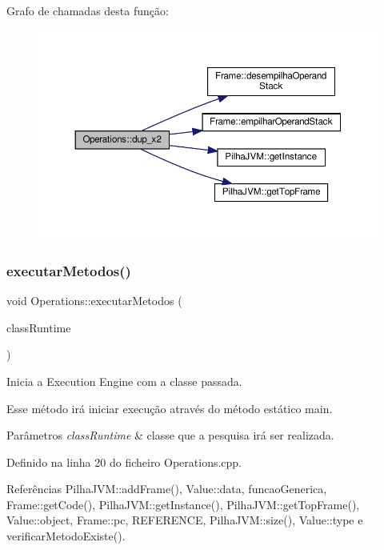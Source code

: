 Grafo de chamadas desta função\+:\nopagebreak
\begin{figure}[H]
\begin{center}
\leavevmode
\includegraphics[width=350pt]{classOperations_adbba871c60bfb34344f2012936beeb25_cgraph}
\end{center}
\end{figure}
\mbox{\label{classOperations_ab771bdb83af6f55d93d126b944d4e73b}} 
\subsubsection{\texorpdfstring{executar\+Metodos()}{executarMetodos()}}
{\footnotesize\ttfamily void Operations\+::executar\+Metodos (\begin{DoxyParamCaption}\item[{\hyperlink{classStaticClass}{Static\+Class} $\ast$}]{class\+Runtime }\end{DoxyParamCaption})}



Inicia a Execution Engine com a classe passada. 

Esse método irá iniciar execução através do método estático main. 
\begin{DoxyParams}{Parâmetros}
{\em class\+Runtime} & classe que a pesquisa irá ser realizada. \\
\hline
\end{DoxyParams}


Definido na linha 20 do ficheiro Operations.\+cpp.



Referências Pilha\+J\+V\+M\+::add\+Frame(), Value\+::data, funcao\+Generica, Frame\+::get\+Code(), Pilha\+J\+V\+M\+::get\+Instance(), Pilha\+J\+V\+M\+::get\+Top\+Frame(), Value\+::object, Frame\+::pc, R\+E\+F\+E\+R\+E\+N\+CE, Pilha\+J\+V\+M\+::size(), Value\+::type e verificar\+Metodo\+Existe().



